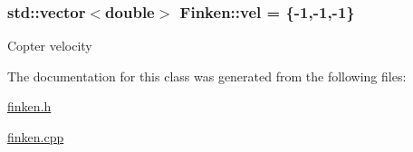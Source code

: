 \subsubsection[{\texorpdfstring{vel}{vel}}]{\setlength{\rightskip}{0pt plus 5cm}std\+::vector$<$double$>$ Finken\+::vel = \{-\/1,-\/1,-\/1\}}\hypertarget{classFinken_a4dd260e6384e7cfb8040bd53fe1c2d62}{}\label{classFinken_a4dd260e6384e7cfb8040bd53fe1c2d62}
Copter velocity 

The documentation for this class was generated from the following files\+:\begin{DoxyCompactItemize}
\item 
\hyperlink{finken_8h}{finken.\+h}\item 
\hyperlink{finken_8cpp}{finken.\+cpp}\end{DoxyCompactItemize}
